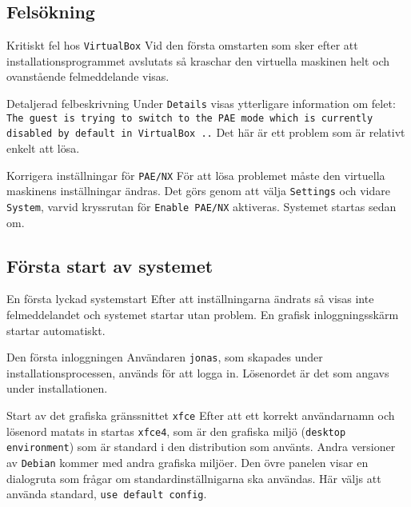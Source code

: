 \subsection{Felsökning}

           {Kritiskt fel hos \texttt{VirtualBox}}
           {Vid den första omstarten som sker efter att installationsprogrammet
            avslutats så kraschar den virtuella maskinen helt och ovanstående
            felmeddelande visas.}
           {}

           {Detaljerad felbeskrivning}
           {Under \texttt{Details} visas ytterligare information om felet:
             \texttt{The guest is trying to switch to the PAE mode which is
            currently disabled by default in VirtualBox ..}
            Det här är ett problem som är relativt enkelt att lösa.}
           {}

           {Korrigera inställningar för \texttt{PAE/NX}}
           {För att lösa problemet måste den virtuella maskinens inställningar
            ändras. Det görs genom att välja \texttt{Settings} och vidare
            \texttt{System}, varvid kryssrutan för \texttt{Enable PAE/NX}
            aktiveras.  Systemet startas sedan om.}
           {}


\subsection{Första start av systemet}

           {En första lyckad systemstart}
           {Efter att inställningarna ändrats så visas inte felmeddelandet och
            systemet startar utan problem. En grafisk inloggningsskärm startar
            automatiskt.}
           {}

           {Den första inloggningen}
           {Användaren \texttt{jonas}, som skapades under
            installationsprocessen, används för att logga in.  Lösenordet är
            det som angavs under installationen.}
           {}

           {Start av det grafiska gränssnittet \texttt{xfce}}
           {Efter att ett korrekt användarnamn och lösenord matats in startas
            \texttt{xfce4}, som är den grafiska miljö
            (\texttt{desktop environment}) som är standard i den distribution
            som använts. Andra versioner av \texttt{Debian} kommer med andra
            grafiska miljöer. Den övre panelen visar en dialogruta som frågar
            om standardinställnigarna ska användas. Här väljs att använda
            standard, \texttt{use default config}.}
           {}


